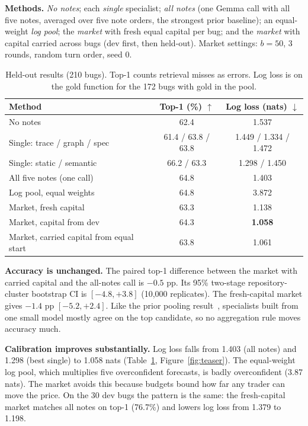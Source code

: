 \documentclass[10pt]{article}
\begin{document}
\textbf{Methods.} \emph{No notes}; each \emph{single} specialist; \emph{all notes} (one Gemma call with all five notes, averaged over five note orders, the strongest prior baseline); an equal-weight \emph{log pool}; the \emph{market} with fresh equal capital per bug; and the \emph{market} with capital carried across bugs (dev first, then held-out). Market settings: $b=50$, 3 rounds, random turn order, seed 0.

\begin{table}[t]
\centering\small
\caption{Held-out results (210 bugs). Top-1 counts retrieval misses as errors. Log loss is on the gold function for the 172 bugs with gold in the pool.}
\label{tab:main}
\begin{tabular}{lcc}
\toprule
Method & Top-1 (\%) $\uparrow$ & Log loss (nats) $\downarrow$ \\
\midrule
No notes & 62.4 & 1.537 \\
Single: trace / graph / spec & 61.4 / 63.8 / 63.8 & 1.449 / 1.334 / 1.472 \\
Single: static / semantic & 66.2 / 63.3 & 1.298 / 1.450 \\
All five notes (one call) & 64.8 & 1.403 \\
Log pool, equal weights & 64.8 & 3.872 \\
\midrule
\textcolor{trade}{Market, fresh capital} & 63.3 & 1.138 \\
\textcolor{trade}{Market, capital from dev} & 64.3 & \textbf{1.058} \\
\textcolor{trade}{Market, carried capital from equal start} & 63.8 & 1.061 \\
\bottomrule
\end{tabular}
\end{table}

\textbf{Accuracy is unchanged.} The paired top-1 difference between the market with carried capital and the all-notes call is $-0.5$ pp. Its 95\% two-stage repository-cluster bootstrap CI is $[-4.8, +3.8]$ (10{,}000 replicates). The fresh-capital market gives $-1.4$ pp $[-5.2, +2.4]$. Like the prior pooling result~\cite{marketbugs}, specialists built from one small model mostly agree on the top candidate, so no aggregation rule moves accuracy much.

\textbf{Calibration improves substantially.} Log loss falls from 1.403 (all notes) and 1.298 (best single) to 1.058 nats (Table~\ref{tab:main}, Figure~\ref{fig:teaser}). The equal-weight log pool, which multiplies five overconfident forecasts, is badly overconfident (3.87 nats). The market avoids this because budgets bound how far any trader can move the price. On the 30 dev bugs the pattern is the same: the fresh-capital market matches all notes on top-1 (76.7\%) and lowers log loss from 1.379 to 1.198.
\end{document}
